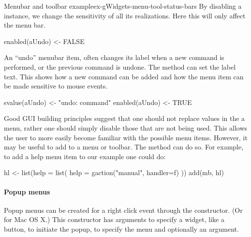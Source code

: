 \begin{example}{Menubar and toolbar example}{ex-gWidgets-menu-tool-status-bars}
By disabling a  instance, we change the sensitivity of
all its realizations. Here this will only affect the menu bar.

\begin{Schunk}
\begin{Sinput}
 enabled(aUndo) <- FALSE
\end{Sinput}
\end{Schunk}

An ``undo'' menubar item, often changes its label when a new command
is performed, or the previous command is undone. The
 method can set the label text. This
shows how a new command can be added and how the menu item can be made
sensitive to mouse events.
\begin{Schunk}
\begin{Sinput}
 svalue(aUndo) <- "undo: command"
 enabled(aUndo) <- TRUE
\end{Sinput}
\end{Schunk}


Good GUI building principles suggest that one should not replace
values in the a menu, rather one should simply disable those that are
not being used. This allows the user to more easily become familiar
with the possible menu items. However, it may be useful to add to a
menu or toolbar. The  method can do so. For
example, to add a help menu item to our example one could do:
\begin{Schunk}
\begin{Sinput}
 hl <- list(help = list(
              help = gaction("manual", handler=f)
              ))
 add(mb, hl)
\end{Sinput}
\end{Schunk}




        
\end{example}

\paragraph{Popup menus}

Popup menus can be created for a right click event through the
 constructor. (Or
 for Mac OS X.) This constructor has arguments
 to specify a widget, like a button, to initiate the popup,
 to specify the menu and optionally an
 argument.


